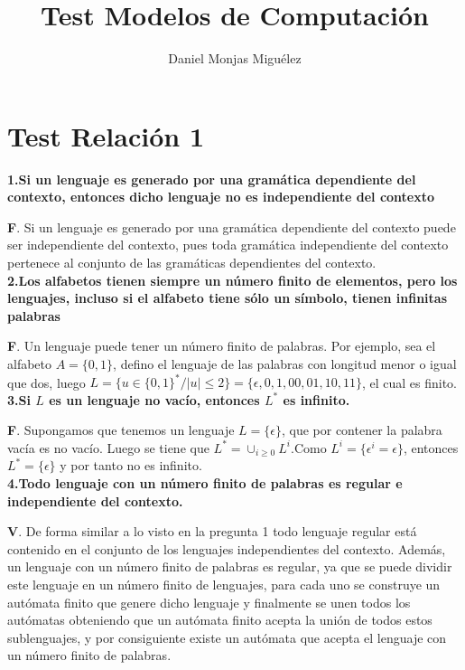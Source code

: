 \documentclass[a4paper,11pt]{article}
\author{Daniel Monjas Miguélez}
\title{Test Modelos de Computación}
\begin{document}
\maketitle

\newpage

\tableofcontents

\newpage

\section{Test Relación 1}
\textbf{1.Si un lenguaje es generado por una gramática dependiente del contexto, entonces dicho lenguaje no es independiente del contexto}

\textbf{F}. Si un lenguaje es generado por una gramática dependiente del contexto puede ser independiente del contexto, pues toda gramática independiente del contexto pertenece al conjunto de las gramáticas dependientes del contexto. \\

\textbf{2.Los alfabetos tienen siempre un número finito de elementos, pero los lenguajes, incluso si el alfabeto tiene sólo un símbolo, tienen infinitas palabras}

\textbf{F}. Un lenguaje puede tener un número finito de palabras. Por ejemplo, sea el alfabeto $A=\{0,1\}$, defino el lenguaje de las palabras con longitud menor o igual que dos, luego $L=\{u\in\{0,1\}^*/|u|\leq 2\}=\{\epsilon,0,1,00,01,10,11\}$, el cual es finito. \\

\textbf{3.Si $L$ es un lenguaje no vacío, entonces $L^*$ es infinito.}

\textbf{F}. Supongamos que tenemos un lenguaje $L=\{\epsilon \}$, que por contener la palabra vacía es no vacío. Luego se tiene que $L^*=\cup_{i\geq 0} L^i$.Como $L^i =\{\epsilon^i=\epsilon \}$, entonces $L^*=\{ \epsilon \}$ y por tanto no es infinito. \\

\textbf{4.Todo lenguaje con un número finito de palabras es regular e independiente del contexto.}

\textbf{V}. De forma similar a lo visto en la pregunta 1 todo lenguaje regular está contenido en el conjunto de los lenguajes independientes del contexto. Además, un lenguaje con un número finito de palabras es regular, ya que se puede dividir este lenguaje en un número finito de lenguajes, para cada uno se construye un autómata finito que genere dicho lenguaje y finalmente se unen todos los autómatas obteniendo que un autómata finito acepta la unión de todos estos sublenguajes, y por consiguiente existe un autómata que acepta el lenguaje con un número finito de palabras. \\
\end{document}
